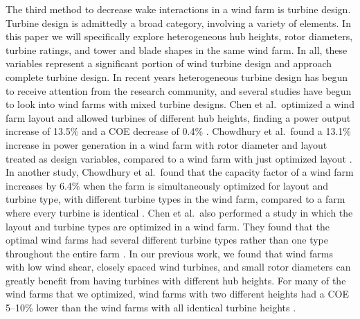 The third method to decrease wake interactions in a wind farm is turbine design. Turbine design is admittedly a broad category, involving a variety of elements. In this paper we will specifically explore heterogeneous hub heights, rotor diameters, turbine ratings, and tower and blade shapes in the same wind farm. In all, these variables represent a significant portion of wind turbine design and approach complete turbine design. 
In recent years heterogeneous turbine design has begun to receive attention from the research community, and several studies have begun to look into wind farms with mixed turbine designs. Chen et al.~optimized
a wind farm layout and allowed turbines of different hub heights, finding a power output increase of 13.5\% and a COE decrease of 0.4\% \citep{chen2013wind}. Chowdhury et al.~found
a 13.1\% increase in power generation in a wind farm with rotor diameter and layout treated as design variables, compared to a wind farm with just optimized layout \citep{chowdhury2010optimizing}. In another study, Chowdhury et al.~found that the capacity factor of a wind farm increases by 6.4\% when the farm is simultaneously optimized for layout and turbine type, with different turbine types in the wind farm, compared to a farm where every turbine is identical \citep{chowdhury2013optimizing}. Chen et al.~also performed a study in which the layout and turbine types are optimized in a wind farm. They found that the optimal wind farms had several different turbine types rather than one type throughout the entire farm \citep{chen2015multi}. In our previous work, we found that wind farms with low wind shear, closely spaced wind turbines, and small rotor diameters can greatly benefit from having turbines with different hub heights. For many of the wind farms that we optimized, wind farms with two different heights had a COE 5--10\% lower than the wind farms with all identical turbine heights \citep{stanley2018}.

